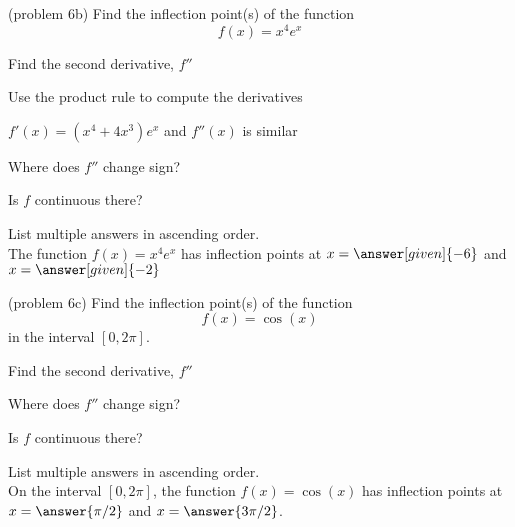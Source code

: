 \documentclass{ximera}
\begin{document}
\begin{problem}(problem 6b)
  Find the inflection point(s) of the function
  \[
     f(x) = x^4e^x
  \]
  
    \begin{hint}
      Find the second derivative, $f''$
    \end{hint}
    \begin{hint}
      Use the product rule to compute the derivatives
    \end{hint}
		\begin{hint}
      $f'(x) = (x^4+4x^3)e^x$ and $f''(x)$ is similar
    \end{hint}
		\begin{hint}
      Where does $f''$ change sign?
    \end{hint}
    \begin{hint}
      Is $f$ continuous there?
    \end{hint} 
		List multiple answers in ascending order.\\
		The function $f(x) = x^4e^x$ has inflection points at 
		$x =\answer[given]{-6}$ and $x =\answer[given]{-2}$
		
\end{problem}


\begin{problem}(problem 6c)
  Find the inflection point(s) of the function 
  \[
     f(x) = \cos(x)
  \]
	in the interval $[0, 2\pi].$\\
 
    \begin{hint}
      Find the second derivative, $f''$
    \end{hint}
		\begin{hint}
      Where does $f''$ change sign?
    \end{hint}
    \begin{hint}
      Is $f$ continuous there?
    \end{hint}  
		List multiple answers in ascending order.\\
	On the interval $[0, 2\pi]$, the function $f(x) = \cos(x)$ has inflection points at $x =\answer{\pi/2}$ and $x=\answer{3\pi/2}$.
		
	
\end{problem}
\end{document}
